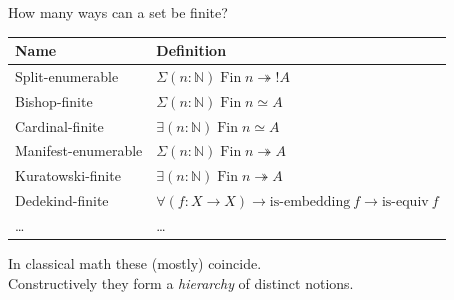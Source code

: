 \documentclass[aspectratio=169,12pt]{beamer}
\newcommand{\isEquiv}{\mathrm{is\text{-}equiv}}
\newcommand{\Fin}{\mathrm{Fin}}
\begin{document}
\begin{frame}{How many ways can a set be finite?}
  \begin{center}
  \begin{tabular}{ll}
    \toprule
    \textbf{Name} & \textbf{Definition} \\
    \midrule
    Split-enumerable &
      $\Sigma(n:\mathbb{N})\; \Fin\;n \twoheadrightarrow ! A$ \\[3pt]
    Bishop-finite &
      $\Sigma(n:\mathbb{N})\; \Fin\;n \simeq A$ \\[3pt]
    Cardinal-finite &
      $\exists(n:\mathbb{N})\; \Fin\;n \simeq A$ \\[3pt]
    Manifest-enumerable &
      $\Sigma(n:\mathbb{N})\; \Fin\;n \twoheadrightarrow A$ \\[3pt]
    Kuratowski-finite &
      $\exists(n:\mathbb{N})\; \Fin\;n \twoheadrightarrow A$ \\[3pt]
    Dedekind-finite &
      $\forall(f:X \to X) \to \mathrm{is\text{-}embedding}\ f \to \isEquiv\ f$ \\[3pt]
    \ldots & \ldots \\
    \bottomrule
  \end{tabular}
  \end{center}
  \pause\medskip
  In classical math these (mostly) coincide. \\
  Constructively they form a \emph{hierarchy} of distinct notions.
\end{frame}
\end{document}
